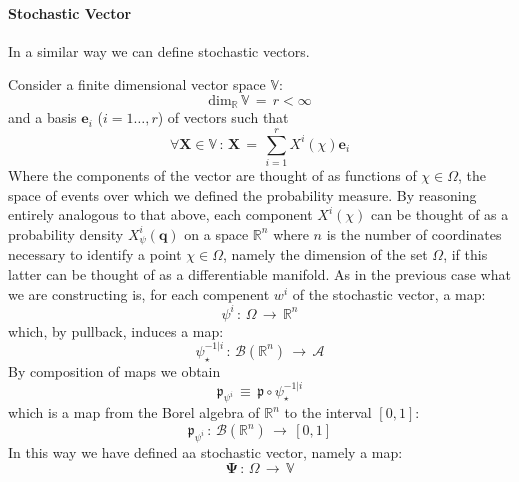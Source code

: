 \documentclass[10pt,a4paper]{article}
\begin{document}
\paragraph{\sc Stochastic Vector}
In a similar way we can define stochastic vectors.
\par
Consider a finite dimensional vector space $\mathbb{V}$:
\begin{equation}\label{lollobrigga}
    \mathrm{dim}_\mathbb{R} \,\mathbb{V}\, = \, r < \infty
\end{equation}
and a basis $\mathbf{e}_i$ ($i=1\dots,r$) of vectors such that
\begin{equation}\label{contellus}
    \forall \mathbf{X} \in \mathbb{V} \, : \, \mathbf{X} \, =\,
    \sum_{i=1}^r X^i(\chi)\mathbf{e}_i
\end{equation}
Where the components of the vector are thought of as functions of $\chi
\in \Omega$,  the space of events over which we defined the probability measure.  By reasoning entirely analogous to that above, each component $X^i(\chi)$ can be thought of as a probability density $X^i_\psi\left(
\mathbf{q}\right)$ on a space $\mathbb{R}^n$ where $n$ is the number of
coordinates necessary to identify a point
$\chi\in\Omega$, namely the dimension of the set $\Omega$, if this latter can be thought of as a differentiable manifold.
As in the previous case what we are constructing is, for each compenent $w^i$ of the stochastic vector, a map:
\begin{equation}\label{coronafine}
    \psi^i \, : \, \Omega \, \rightarrow \, \mathbb{R}^n
\end{equation}
which, by pullback, induces a map:
\begin{equation}\label{polloalladiavola}
    \psi^{-1|i}_{\star} \, : \, \mathcal{B}(\mathbb{R}^n) \, \rightarrow
    \, \mathcal{A}
\end{equation}
By composition of maps we obtain
\begin{equation}\label{scortabella}
    \mathfrak{p}_{\psi^i} \, \equiv \, \mathfrak{p}\circ\psi^{-1|i}_\star
\end{equation}
which is a map from the Borel algebra  of
$\mathbb{R}^n$ to the interval $[0,1]$:
\begin{equation}\label{cromatogno}
    \mathfrak{p}_{\psi^i} \, : \, \mathcal{B}\left(\mathbb{R}^n\right) \, \rightarrow \,
    [0,1]
\end{equation}
In this way we have defined  aa stochastic vector, namely a map:
\begin{equation}\label{coronaspessa}
    \pmb{\Psi} \, : \, \Omega \, \rightarrow \, \mathbb{V}
\end{equation}
\end{document}
